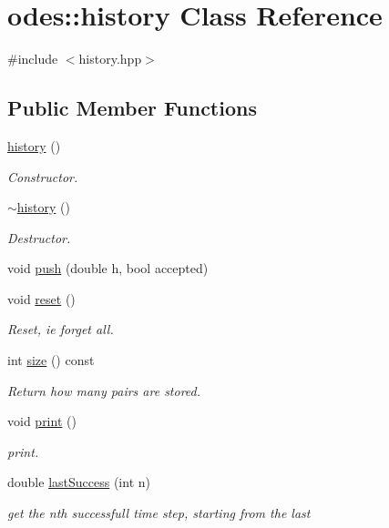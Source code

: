 \hypertarget{classodes_1_1history}{\section{odes\-:\-:history Class Reference}
\label{classodes_1_1history}
}


{\ttfamily \#include $<$history.\-hpp$>$}

\subsection*{Public Member Functions}
\begin{DoxyCompactItemize}
\item 
\hyperlink{classodes_1_1history_a953c729c3e1bdb2bd6120cd53e5f0539}{history} ()
\begin{DoxyCompactList}\small\item\em Constructor. \end{DoxyCompactList}\item 
\hyperlink{classodes_1_1history_a19d0f13a5169fa5c1358823f90d8e56d}{$\sim$history} ()
\begin{DoxyCompactList}\small\item\em Destructor. \end{DoxyCompactList}\item 
void \hyperlink{classodes_1_1history_af76d11c6d060e38f1ff1b04aac728d80}{push} (double h, bool accepted)
\item 
void \hyperlink{classodes_1_1history_acb1df1c52bdb13b74f36ac3901dc0173}{reset} ()
\begin{DoxyCompactList}\small\item\em Reset, ie forget all. \end{DoxyCompactList}\item 
int \hyperlink{classodes_1_1history_a67fd21675aecce2bf1ba58b9cc547381}{size} () const 
\begin{DoxyCompactList}\small\item\em Return how many pairs are stored. \end{DoxyCompactList}\item 
void \hyperlink{classodes_1_1history_aa52f2577ded842a01cad5731945d4aa3}{print} ()
\begin{DoxyCompactList}\small\item\em print. \end{DoxyCompactList}\item 
double \hyperlink{classodes_1_1history_a137790d2a587a37f4c381f66d3ced5c6}{last\-Success} (int n)
\begin{DoxyCompactList}\small\item\em get the nth successfull time step, starting from the last \end{DoxyCompactList}\end{DoxyCompactItemize}
